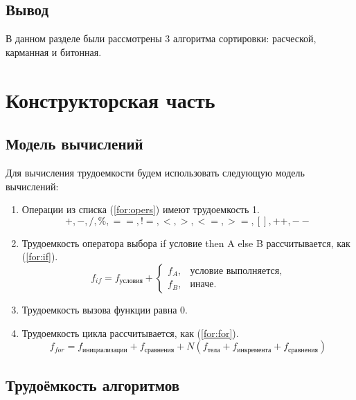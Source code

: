 \documentclass[12pt]{report}
\begin{document}
	\section*{Вывод}
	
	В данном разделе были рассмотрены 3 алгоритма сортировки: расческой, карманная и битонная.
	
	\clearpage
	
	\chapter{Конструкторская часть}
	
	\section{Модель вычислений}

	Для вычисления трудоемкости будем использовать следующую модель вычислений:

	\begin{enumerate}
		\item Операции из списка (\ref{for:opers}) имеют трудоемкость 1.
		\begin{equation}
		\label{for:opers}
		+, -, /, \%, ==, !=, <, >, <=, >=, [], ++, {-}-
		\end{equation}
		\item Трудоемкость оператора выбора if условие then A else B рассчитывается, как (\ref{for:if}).
		\begin{equation}
		\label{for:if}
		f_{if} = f_{\text{условия}} +
		\begin{cases}
		f_A, & \text{условие выполняется,}\\
		f_B, & \text{иначе.}
		\end{cases}
		\end{equation}
		\item Трудоемкость вызова функции равна 0.
		\item Трудоемкость цикла рассчитывается, как (\ref{for:for}).
		\begin{equation}
		\label{for:for}
		f_{for} = f_{\text{инициализации}} + f_{\text{сравнения}} + N(f_{\text{тела}} + f_{\text{инкремента}} + f_{\text{сравнения}})
		\end{equation}
	\end{enumerate}
	
	\section{Трудоёмкость алгоритмов}
\end{document}
